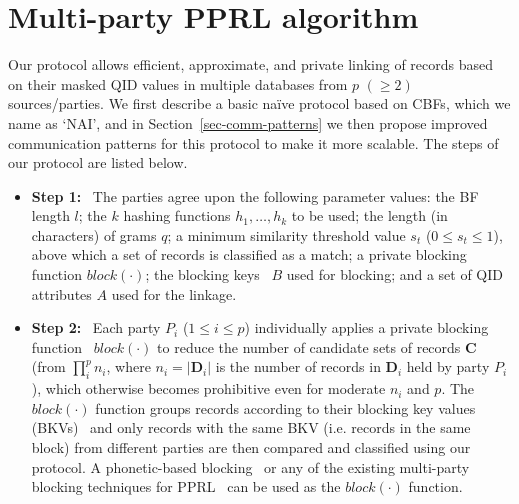 \documentclass{sig-alternate}
\begin{document}
\section{Multi-party PPRL algorithm}
\label{sec:algorithm}

Our protocol allows efficient, approximate, and private linking of
records based on their masked QID values in multiple databases
from $p$ $(\ge 2)$ sources/parties.
We first describe a basic na\"{i}ve protocol
based on CBFs,
which we name as `NAI', and in Section~\ref{sec-comm-patterns} we then
propose improved communication patterns for this protocol
to make it more scalable.
The steps of our protocol are listed below. 

\begin{itemize}

\item \textbf{Step 1:}~
The parties agree upon the following parameter values:
      the BF length $l$;
      the $k$ hashing 
      functions $h_1, \ldots, h_k$ to be used; the length (in characters) of 
      grams $q$; a minimum similarity threshold value $s_t$ ($0 \le s_t \le 1$),
      above which a set of records is classified as a match;
      a private blocking function $block(\cdot)$; 
      the blocking keys~\cite{Chr12} $B$ used for blocking; 
      and a set of QID attributes $A$ used for the linkage.

\item \textbf{Step 2:}~
Each party $P_i$ ($1 \le i \le p$) individually 
applies a private blocking
function~\cite{Vat13} $block(\cdot)$ 
to reduce the number of candidate sets of
records $\mathbf{C}$ (from $\prod_i^p n_i$, where $n_i = |\mathbf{D}_i|$ 
is the number of records in $\mathbf{D}_i$ held by party $P_i$),
which otherwise becomes prohibitive even
for moderate $n_i$ and $p$. 
The $block(\cdot)$ function groups records according to their
blocking key values (BKVs)~\cite{Chr11} and only 
records with the same BKV 
(i.e. records in the same block)
from different parties are then 
compared and classified 
using our protocol.
A phonetic-based blocking~\cite{Chr12}
or any of the 
existing multi-party blocking techniques for PPRL~\cite{Ran14,Ran15}
can be used as the $block(\cdot)$ function. 


\end{itemize}
\end{document}
